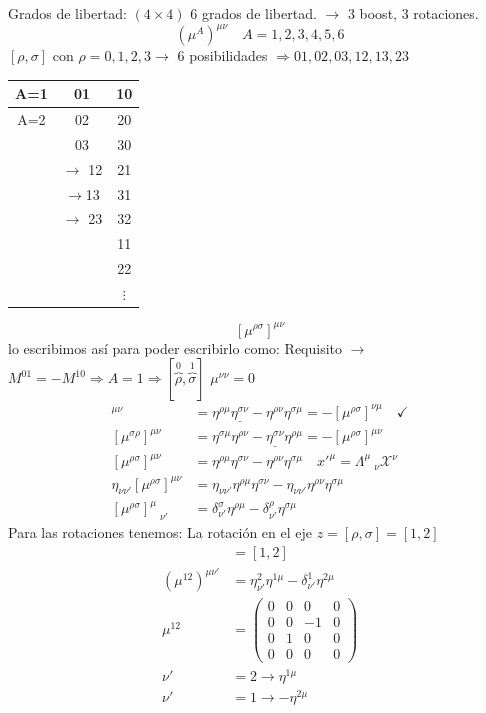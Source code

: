 \documentclass[a4paper,12pt]{article}
\begin{document}
Grados de libertad: $(4\times 4 )$ 6 grados de libertad. $\to$ 3 boost, 3 rotaciones. 
\[
(\mu^A )^{\mu \nu } \quad A = 1,2,3,4,5,6
\]
$[\rho, \sigma ]$ con $\rho =0,1,2,3  \to$  6 posibilidades $\Rightarrow 01,02,03,12,13,23$ 
\begin{table}[h]
    \centering
    \begin{tabular}{c|c|c}
         A=1 &01& 10  \\\hline
         A=2 &02&  20 \\ \hline
         &03&30 \\  
         &$\to$ 12&21\\  
         &$\to $13& 31 \\  
         &$\to $ 23 & 32 \\  
         &&11 \\
         &&22\\
         & & $\vdots$
    \end{tabular}
\end{table}
\[
[ \mu^{\rho \sigma} ]^{\mu \nu } 
\]
lo escribimos así para poder escribirlo como:  Requisito $\to $ $M^{01 } =-M^{10} \Rightarrow A= 1 \Rightarrow [\overbrace{\rho}^0,\overbrace{\sigma}^{1}  ] $ $\mu^{\nu \nu} = 0$
\begin{align*}
    [\mu ^{\rho \sigma }]^{\mu  \nu } &= \eta ^{\rho \mu } \underline{\eta^{\sigma \nu }} -\eta^{\rho \nu } \eta^{\sigma \mu } =- [\mu ^{\rho \sigma }]^{\nu \mu} \quad \checkmark \\
    [\mu^{\sigma \rho }  ]^{\mu \nu } &= \eta^{\sigma \mu } \eta^{\rho \nu }- \underline{\eta^{\sigma \nu }} \eta^{\rho \mu } = -[\mu ^{\rho \sigma } ] ^{\mu \nu} \\
    [\mu ^{\rho \sigma }]^{\mu \nu }  &= \eta^{\rho \mu} \eta^{\sigma \nu}  - \eta^{\rho \nu} \eta^{ \sigma \mu  } \quad x'^\mu = \Lambda^\mu_{\quad \nu } \mathcal{X}^\nu \\
    \eta_{\nu \nu'}[\mu ^{\rho \sigma }]^{\mu \nu }  &= \eta_{\nu \nu' } \eta^{\rho \mu } \eta^{\sigma \nu } - \eta_{\nu \nu' } \eta^{\rho \nu } \eta^{\sigma \mu  } \\
    [\mu ^{\rho \sigma }]^{\mu }_{\quad \nu '}  &= \delta_{\nu' }^{\sigma }  \eta^{\rho \mu }- \delta_{\nu ' }  ^\rho \eta^{\sigma \mu }
\end{align*}
Para las rotaciones tenemos: La rotación en el eje $z = [ \rho, \sigma ] = [1,2] $
\begin{align*}
[\rho, \sigma ] &= [1,2] \\
(\mu^{12})^{\mu \nu'} &=  \eta_{\nu '}^2 \eta^{1 \mu } - \delta_{\nu' }^1\eta^{2 \mu }\\
\mu ^{12} &= \begin{pmatrix}0&0&0&0\\0&0&-1&0\\0&1&0&0\\0&0&0&0\end{pmatrix}\\
\nu' &=2 \to \eta^{1 \mu } \\
\nu' &= 1 \to -\eta^{2\mu }
\end{align*}
\end{document}
